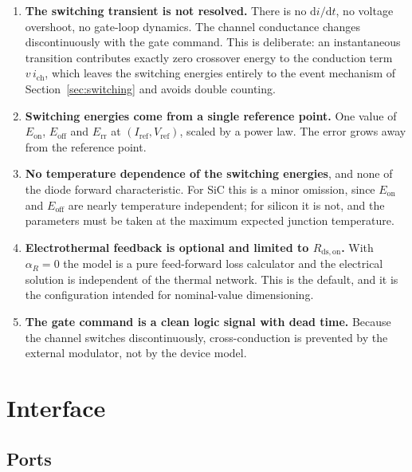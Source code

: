 \documentclass[11pt,a4paper]{article}
\newcommand{\Rdson}{R_\mathrm{ds,on}}
\newcommand{\Eon}{E_\mathrm{on}}
\newcommand{\Eoff}{E_\mathrm{off}}
\newcommand{\Err}{E_\mathrm{rr}}
\newcommand{\dd}{\mathrm{d}}
\begin{document}
\begin{enumerate}
\item \textbf{The switching transient is not resolved.} There is no $\dd i/\dd t$,
      no voltage overshoot, no gate-loop dynamics. The channel conductance
      changes discontinuously with the gate command. This is deliberate: an
      instantaneous transition contributes exactly zero crossover energy to the
      conduction term $v\,i_\mathrm{ch}$, which leaves the switching energies
      entirely to the event mechanism of
      Section~\ref{sec:switching} and avoids double counting.
\item \textbf{Switching energies come from a single reference point.} One value
      of $\Eon$, $\Eoff$ and $\Err$ at $(I_\mathrm{ref},V_\mathrm{ref})$, scaled
      by a power law. The error grows away from the reference point.
\item \textbf{No temperature dependence of the switching energies}, and none of
      the diode forward characteristic. For SiC this is a minor omission, since
      $\Eon$ and $\Eoff$ are nearly temperature independent; for silicon it is
      not, and the parameters must be taken at the maximum expected junction
      temperature.
\item \textbf{Electrothermal feedback is optional and limited to $\Rdson$.}
      With $\alpha_R=0$ the model is a pure feed-forward loss calculator and the
      electrical solution is independent of the thermal network. This is the
      default, and it is the configuration intended for nominal-value
      dimensioning.
\item \textbf{The gate command is a clean logic signal with dead time.} Because
      the channel switches discontinuously, cross-conduction is prevented by the
      external modulator, not by the device model.
\end{enumerate}

\section{Interface}

\subsection{Ports}
\end{document}
